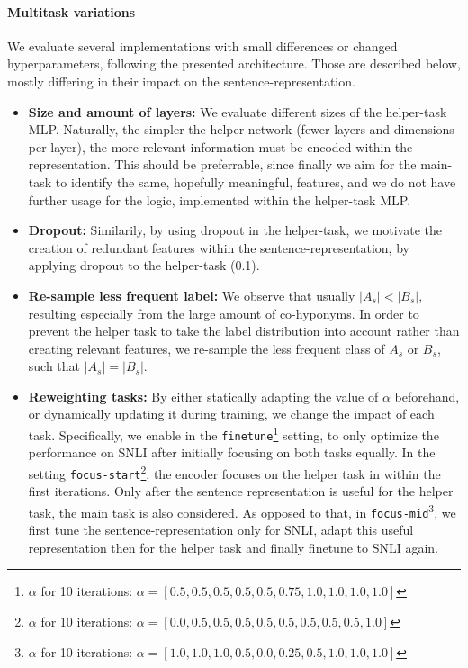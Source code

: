 \paragraph*{Multitask variations}
We evaluate several implementations with small differences or changed hyperparameters, following the presented architecture. Those are described below, mostly differing in their impact on the sentence-representation. 
\begin{itemize}
\item \textbf{Size and amount of layers:} We evaluate different sizes of the helper-task \ac{MLP}. Naturally, the simpler the helper network (fewer layers and dimensions per layer), the more relevant information must be encoded within the representation. This should be preferrable, since finally we aim for the main-task to identify the same, hopefully meaningful, features, and we do not have further usage for the logic, implemented within the helper-task \ac{MLP}.
\item  \textbf{Dropout:} Similarily, by using dropout in the helper-task, we motivate the creation of redundant features within the sentence-representation, by applying dropout to the helper-task (0.1).
\item \textbf{Re-sample less frequent label:} We observe that usually $|A_s| < |B_s|$, resulting especially from the large amount of co-hyponyms. In order to prevent the helper task to take the label distribution into account rather than creating relevant features, we re-sample the less frequent class of $A_s$ or $B_s$, such that $|A_s| = |B_s|$.
\item \textbf{Reweighting tasks:} By either statically adapting the value of $\alpha$ beforehand, or dynamically updating it during training, we change the impact of each task. Specifically, we enable in the \texttt{finetune}\footnote{$\alpha$ for 10 iterations: $\alpha = [0.5, 0.5, 0.5, 0.5, 0.5, 0.75, 1.0, 1.0, 1.0, 1.0]$} setting, to only optimize the performance on \ac{SNLI} after initially focusing on both tasks equally. In the setting \texttt{focus-start}\footnote{$\alpha$ for 10 iterations: $\alpha = [0.0, 0.5, 0.5, 0.5, 0.5, 0.5, 0.5, 0.5, 0.5, 1.0]$}, the encoder focuses on the helper task in within the first iterations. Only after the sentence representation is useful for the helper task, the main task is also considered. As opposed to that, in \texttt{focus-mid}\footnote{$\alpha$ for 10 iterations: $\alpha = [1.0, 1.0, 1.0, 0.5, 0.0, 0.25, 0.5, 1.0, 1.0, 1.0]$}, we first tune the sentence-representation only for \ac{SNLI}, adapt this useful representation then for the helper task and finally finetune to \ac{SNLI} again.

\end{itemize}
